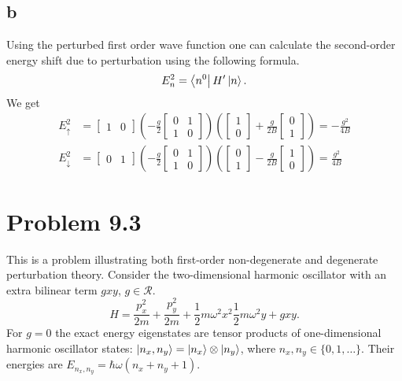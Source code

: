 \documentclass[11pt]{amsart}
\begin{document}
\subsection*{b}
Using the perturbed first order wave function one can calculate the second-order energy shift due to perturbation using the following formula.
\begin{equation}
E^2_n = \bra{n^0}H'\ket{n}.
\end{equation}
We get
\begin{align*}
E_\uparrow^2 &= \begin{bmatrix}
1 & 0
\end{bmatrix} 
\left(
-\frac{g}{2}
\begin{bmatrix}
0 & 1 \\
1 & 0
\end{bmatrix}
\right)
\left(
\begin{bmatrix}
1 \\ 0
\end{bmatrix}
+\frac{g}{2B}
\begin{bmatrix}
0 \\ 1
\end{bmatrix}
\right)
= -\frac{g^2}{4B} \\
E_\downarrow^2 &= \begin{bmatrix}
0 & 1
\end{bmatrix} 
\left(
-\frac{g}{2}
\begin{bmatrix}
0 & 1 \\
1 & 0
\end{bmatrix}
\right)
\left(
\begin{bmatrix}
0 \\ 1
\end{bmatrix}
-\frac{g}{2B}
\begin{bmatrix}
1 \\ 0
\end{bmatrix}
\right)
= \frac{g^2}{4B}
\end{align*}

\section*{Problem 9.3}
This is a problem illustrating both first-order non-degenerate and degenerate perturbation theory. Consider the two-dimensional harmonic oscillator with an extra bilinear term $gxy$, $g \in \mathcal{R}$.
\begin{equation}
H = \frac{p_x^2}{2m} + \frac{p_y^2}{2m} + \frac{1}{2}m\omega^2x^2 \frac{1}{2}m\omega^2y + gxy.
\end{equation} 
For $g=0$ the exact energy eigenstates are tensor products of one-dimensional harmonic oscillator states: $\ket{n_x,n_y}=\ket{n_x}\otimes\ket{n_y}$, where $n_x,n_y \in \{0,1,\dots \}$. Their energies are $E_{n_x,n_y}=\hbar\omega(n_x + n_y +1)$.
\end{document}
